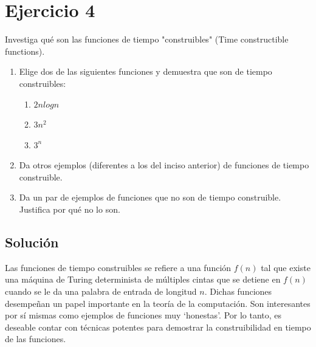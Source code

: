 \section{Ejercicio 4}


\begin{tcolorbox}[enunciado]
Investiga qué son las funciones de tiempo "construibles" (Time constructible functions).
\begin{enumerate}
\item Elige dos de las siguientes funciones y demuestra que son de tiempo construibles:
\begin{enumerate}
    \item $2nlogn$
    \item $3n^2$
    \item $3^n$
\end{enumerate}
\item Da otros ejemplos (diferentes a los del inciso anterior) de funciones de tiempo construible.
\item Da un par de ejemplos de funciones que no son de tiempo construible. Justifica por qué no lo son.


\end{enumerate}
\end{tcolorbox}

\subsection{Solución}

Las funciones de tiempo construibles se refiere a una función $f(n)$ tal que existe una máquina de Turing determinista de múltiples cintas que se detiene en $f(n)$ cuando se le da una palabra de entrada de longitud $n$. Dichas funciones desempeñan un papel importante en la teoría de la computación. Son interesantes por sí mismas como ejemplos de funciones muy `honestas'. Por lo tanto, es deseable contar con técnicas potentes para demostrar la construibilidad en tiempo de las funciones.\\

